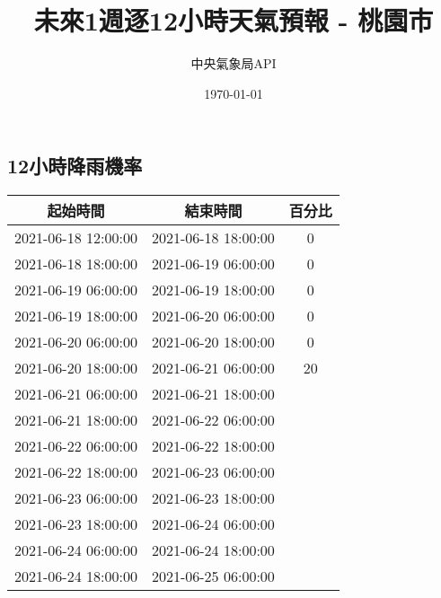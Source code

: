 \documentclass{article}%
\title{未來1週逐12小時天氣預報 {-} 桃園市}%
\author{中央氣象局API}%
\date{\today}%
\begin{document}
%
\normalsize%
\maketitle%
\begin{center}%
\section{12小時降雨機率}%
\label{sec:12}%
\begin{tabular}{|c|c|c|}%
\hline%
起始時間&結束時間&百分比\\%
\hline%
2021{-}06{-}18 12:00:00&2021{-}06{-}18 18:00:00&0\\%
\hline%
2021{-}06{-}18 18:00:00&2021{-}06{-}19 06:00:00&0\\%
\hline%
2021{-}06{-}19 06:00:00&2021{-}06{-}19 18:00:00&0\\%
\hline%
2021{-}06{-}19 18:00:00&2021{-}06{-}20 06:00:00&0\\%
\hline%
2021{-}06{-}20 06:00:00&2021{-}06{-}20 18:00:00&0\\%
\hline%
2021{-}06{-}20 18:00:00&2021{-}06{-}21 06:00:00&20\\%
\hline%
2021{-}06{-}21 06:00:00&2021{-}06{-}21 18:00:00& \\%
\hline%
2021{-}06{-}21 18:00:00&2021{-}06{-}22 06:00:00& \\%
\hline%
2021{-}06{-}22 06:00:00&2021{-}06{-}22 18:00:00& \\%
\hline%
2021{-}06{-}22 18:00:00&2021{-}06{-}23 06:00:00& \\%
\hline%
2021{-}06{-}23 06:00:00&2021{-}06{-}23 18:00:00& \\%
\hline%
2021{-}06{-}23 18:00:00&2021{-}06{-}24 06:00:00& \\%
\hline%
2021{-}06{-}24 06:00:00&2021{-}06{-}24 18:00:00& \\%
\hline%
2021{-}06{-}24 18:00:00&2021{-}06{-}25 06:00:00& \\%
\hline%
\end{tabular}

%

\end{center}
\end{document}
